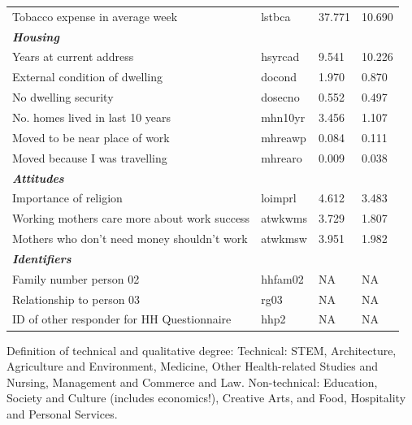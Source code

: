 \documentclass[12pt, a4paper]{article}
\begin{document}
\begin{longtable}{p{} C{0.15\textwidth} C{0.15\textwidth} C{0.15\textwidth}}
Tobacco expense in average week 	& 	lstbca	 & 	37.771	 & 	10.690	 \\
\textbf{\textit{Housing}} 	& 		 & 		 & 		 \\
Years at current address 	& 	hsyrcad	 & 	9.541	 & 	10.226	 \\
External condition of dwelling 	& 	docond	 & 	1.970	 & 	0.870	 \\
No dwelling security 	& 	dosecno	 & 	0.552	 & 	0.497	 \\
No.  homes lived in last 10 years 	& 	mhn10yr	 & 	3.456	 & 	1.107	 \\
Moved to be near place of work 	& 	mhreawp	 & 	0.084	 & 	0.111	 \\
Moved because I was travelling	& 	mhrearo	 & 	0.009	 & 	0.038	 \\
\textbf{\textit{Attitudes}} 	& 		 & 		 & 		 \\
Importance of religion 	& 	loimprl	 & 	4.612	 & 	3.483	 \\
Working mothers care more about work success 	& 	atwkwms	 & 	3.729	 & 	1.807	 \\
Mothers who don't need money shouldn't work 	& 	atwkmsw	 & 	3.951	 & 	1.982	 \\
\textbf{\textit{Identifiers}} 	& 		 & 		 & 		 \\
Family number person 02 	& 	hhfam02	 & 	NA	 & 	NA	 \\
Relationship to person 03 	& 	rg03	 & 	NA	 & 	NA	 \\
ID of other responder for HH Questionnaire 	& 	hhp2	 & 	NA	 & 	NA
\label{tab:sumstats}
\end{longtable}
\parbox{1.05\textwidth}{\footnotesize *Definition of technical and qualitative degree: Technical: STEM, Architecture, Agriculture and Environment, Medicine, Other Health-related Studies and Nursing, Management and Commerce and Law. Non-technical: Education, Society and Culture (includes economics!), Creative Arts, and Food, Hospitality and Personal Services.}  \\
\end{document}
